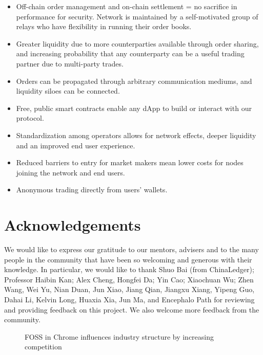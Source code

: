 \documentclass[UTF8,nofonts]{article}
\begin{document}
\begin{itemize}
	\item Off-chain order management and on-chain settlement = no sacrifice in performance for security.
Network is maintained by a self-motivated group of relays who have flexibility in running their order books.
	\item Greater liquidity due to more counterparties available through order sharing, and increasing probability that any counterparty can be a useful trading partner due to multi-party trades.
	\item Orders can be propagated through arbitrary communication mediums, and liquidity siloes can be connected.
	\item Free, public smart contracts enable any dApp to build or interact with our protocol.
	\item Standardization among operators allows for network effects, deeper liquidity and an improved end user experience.
	\item Reduced barriers to entry for market makers mean lower costs for nodes joining the network and end users.
	\item Anonymous trading directly from users’ wallets.
\end{itemize}

\section{Acknowledgements}
We would like to express our gratitude to our mentors, advisers and to the many people in the community that have been so welcoming and generous with their knowledge. In particular, we would like to thank Shuo Bai (from ChinaLedger); Professor Haibin Kan; Alex Cheng, Hongfei Da; Yin Cao; Xiaochuan Wu; Zhen Wang, Wei Yu, Nian Duan, Jun Xiao, Jiang Qian, Jiangxu Xiang, Yipeng Guo, Dahai Li, Kelvin Long, Huaxia Xia, Jun Ma, and Encephalo Path for reviewing and providing feedback on this project. We also welcome more feedback from the community.






\newpage

\begin{figure}[h]
\centering
{}
\caption{FOSS in Chrome influences industry structure by increasing competition}
\label{fig:6forces}
\end{figure}
\end{document}
